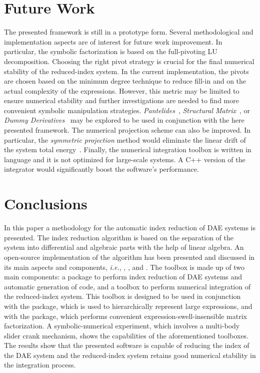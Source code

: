 
\section{Future Work}
\label{chap6:sec:future_work}

The presented framework is still in a prototype form. Several methodological and implementation aspects are of interest for future work improvement. In particular, the symbolic factorization is based on the full-pivoting LU decomposition. Choosing the right pivot strategy is crucial for the final numerical stability of the reduced-index system. In the current implementation, the pivots are chosen based on the minimum degree technique to reduce fill-in and on the actual complexity of the expressions. However, this metric may be limited to ensure numerical stability and further investigations are needed to find more convenient symbolic manipulation strategies. \emph{Pantelides}~\cite{pantelides1988consistent}, \emph{Structural Matrix}~\cite{unger1995structural,unger1995structural}, or \emph{Dummy Derivatives}~\cite{mattsson1993index} may be explored to be used in conjunction with the here presented framework. The numerical projection scheme can also be improved. In particular, the \emph{symmetric projection} method would eliminate the linear drift of the system total energy~\cite{hairer2000symmetric}. Finally, the numerical integration toolbox is written in \Matlab{} language and it is not optimized for large-scale systems. A C++ version of the integrator would significantly boost the software's performance.


\section{Conclusions}
\label{chap6:sec:conclusions}

In this paper a methodology for the automatic index reduction of \ac{DAE} systems is presented. The index reduction algorithm is based on the separation of the system into differential and algebraic parts with the help of linear algebra. An open-source implementation of the algorithm has been presented and discussed in its main aspects and components, \emph{i.e.}, \LEM{}, \LAST{}, and \Indigo{}. The \Indigo{} toolbox is made up of two main components: a \Maple{} package to perform index reduction of \ac{DAE} systems and automatic generation of \Matlab{} code, and a \Matlab{} toolbox to perform numerical integration of the reduced-index system. This toolbox is designed to be used in conjunction with the \LEM{} package, which is used to hierarchically represent large expressions, and with the \LAST{} package, which performs convenient expression-swell-insensible matrix factorization. A symbolic-numerical experiment, which involves a multi-body slider crank mechanism, shows the capabilities of the aforementioned toolboxes. The results show that the presented software is capable of reducing the index of the \ac{DAE} system and the reduced-index system retains good numerical stability in the integration process.

